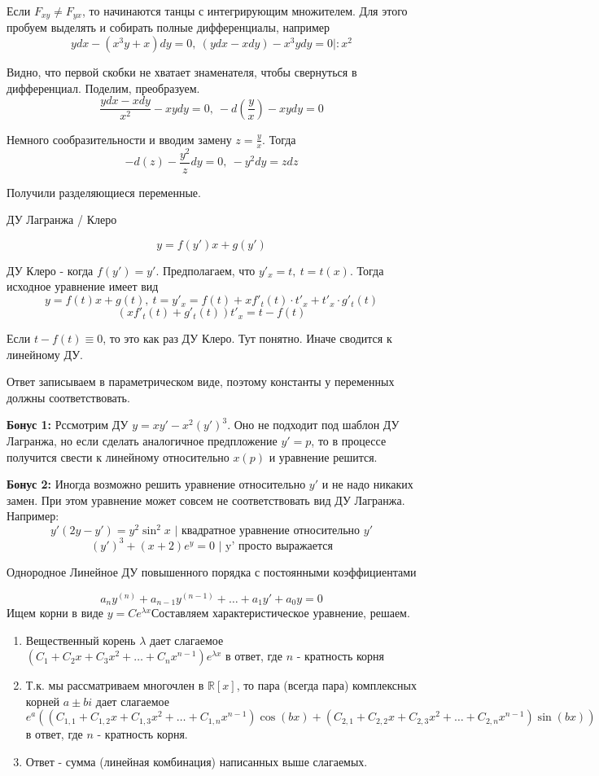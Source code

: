 \documentclass[11pt]{article}
\begin{document}
	Если $F_{xy} \neq F_{yx}$, то начинаются танцы с интегрирующим множителем. Для этого пробуем выделять и собирать полные дифференциалы, например
	$$ydx - (x^3 y+x)dy = 0,\ (ydx - xdy) - x^3 ydy = 0 |: x^2$$
	
	Видно, что первой скобки не хватает знаменателя, чтобы свернуться в дифференциал. Поделим, преобразуем.
	$$\frac{ydx - xdy}{x^2} - xy dy = 0,\ -d(\frac{y}{x}) - xy dy = 0$$
	
	Немного сообразительности и вводим замену $z = \frac{y}{x}$. Тогда 
	$$-d(z) - \frac{y^2}{z} dy = 0,\ -y^2 dy = z dz$$
	
	Получили разделяющиеся переменные.
	
	\begin{center}
		ДУ Лагранжа / Клеро
	\end{center}
	$$y = f(y') x + g(y')$$
	
	ДУ Клеро - когда $f(y') = y'$. Предполагаем, что $y'_x = t,\ t = t(x)$. Тогда исходное уравнение имеет вид
	$$y = f(t) x + g(t),\ t = y'_x = f(t) + xf'_t(t)\cdot t'_x + t'_x\cdot g'_t(t) $$
	$$(xf'_t(t) + g'_t(t))t'_x = t - f(t)$$
	
	Если $t - f(t) \equiv 0$, то это как раз ДУ Клеро. Тут понятно. Иначе сводится к линейному ДУ.
	
	Ответ записываем в параметрическом виде, поэтому константы у переменных должны соответствовать.
	
	\textbf{Бонус 1:} Рссмотрим ДУ $y = xy' - x^2 (y')^3$. Оно не подходит под шаблон ДУ Лагранжа, но если сделать аналогичное предпложение $y' = p$, то в процессе получится свести к линейному относительно $x(p)$ и уравнение решится.
	
	\textbf{Бонус 2:} Иногда возможно решить уравнение относительно $y'$ и не надо никаких замен. При этом уравнение может совсем не соответствовать вид ДУ Лагранжа. Например:
	$$y'(2y - y') = y^2 \sin^2 x \text{ | квадратное уравнение относительно } y'$$ 
	$$(y')^3 + (x+2)e^y = 0 \text{ | y' просто выражается}$$ 
	\begin{center}
		Однородное Линейное ДУ повышенного порядка с постоянными коэффициентами
	\end{center}
	$$a_{n} y^{(n)} +a_{n-1} y^{(n-1)} + \dots + a_{1} y' + a_{0} y = 0 $$
	Ищем корни в виде $y = Ce^{\lambda x}$Составляем характеристическое уравнение, решаем.
	\begin{enumerate}
		\item Вещественный корень $\lambda$ дает слагаемое $(C_1 + C_2 x + C_3 x^2 + \dots + C_n x^{n-1})e^{\lambda x}$ в ответ, где $n$ - кратность корня
		\item Т.к. мы рассматриваем многочлен в $\mathbb{R}[x]$, то пара (всегда пара) комплексных корней $a \pm bi$ дает слагаемое $e^a((C_{1, 1} + C_{1, 2} x + C_{1, 3} x^2 + \dots + C_{1, n} x^{n-1}) \cos(bx) + (C_{2, 1} + C_{2, 2} x + C_{2, 3} x^2 + \dots + C_{2, n} x^{n-1}) \sin(bx))$ в ответ, где $n$ - кратность корня.
		\item Ответ - сумма (линейная комбинация) написанных выше слагаемых.
		
	\end{enumerate}
\end{document}

